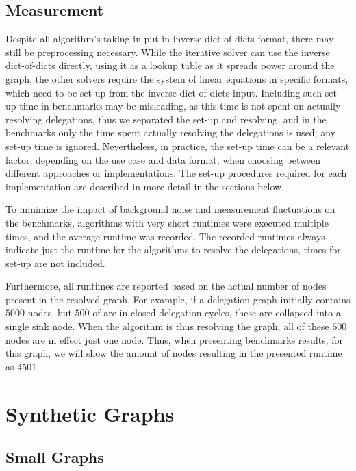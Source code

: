 \subsection{Measurement}

Despite all algorithm's taking in put in inverse dict-of-dicts format, there may still be preprocessing necessary. While the iterative solver can use the inverse dict-of-dicts directly, using it as a lookup table as it spreads power around the graph, the other solvers require the system of linear equations in specific formats, which need to be set up from the inverse dict-of-dicts input. Including such set-up time in benchmarks may be misleading, as this time is not spent on actually resolving delegations, thus we separated the set-up and resolving, and in the benchmarks only the time spent actually resolving the delegations is used; any set-up time is ignored. Nevertheless, in practice, the set-up time can be a relevant factor, depending on the use case and data format, when choosing between different approaches or implementations. The set-up procedures required for each implementation are described in more detail in the sections below.

To minimize the impact of background noise and measurement fluctuations on the benchmarks, algorithms with very short runtimes were executed multiple times, and the average runtime was recorded. The recorded runtimes always indicate just the runtime for the algorithms to resolve the delegations, times for set-up are not included. 

Furthermore, all runtimes are reported based on the actual number of nodes present in the resolved graph. For example, if a delegation graph initially contains $5000$ nodes, but $500$ of are in closed delegation cycles, these are collapsed into a single sink node. 
When the algorithm is thus resolving the graph, all of these $500$ nodes are in effect just one node. Thus, when presenting benchmarks results, for this graph, we will show the amount of nodes resulting in the presented runtime as $4501$. 

\section{Synthetic Graphs}
\label{sec:synthetic_graphs}

\subsection{Small Graphs}
\label{subsec:small_graphs}

